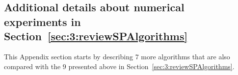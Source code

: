




\subsection{Additional details about numerical experiments in Section~\ref{sec:3:reviewSPAlgorithms}}
\label{sub:3:additionalExperiments}

This Appendix section starts by describing $7$ more algorithms that are also compared with the $9$ presented above in Section~\ref{sec:3:reviewSPAlgorithms}.


